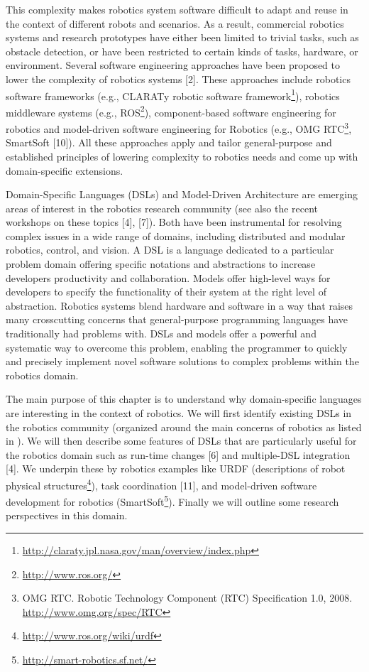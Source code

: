 \documentclass[doc]{apa}
\begin{document}
This complexity makes robotics system software difficult to adapt and reuse in the context of different robots and scenarios. As a result, commercial robotics systems and research prototypes have either been limited to trivial tasks, such as obstacle detection, or have been restricted to certain kinds of tasks, hardware, or environment. Several software engineering approaches have been proposed to lower the complexity of robotics systems [2]. These approaches include robotics software frameworks (e.g., CLARATy robotic software framework\footnote{\url{http://claraty.jpl.nasa.gov/man/overview/index.php}}), robotics middleware systems (e.g., ROS\footnote{\url{http://www.ros.org/}}), component-based software engineering for robotics\cite{Brugali:2007oq} and model-driven software engineering for Robotics (e.g., OMG RTC\footnote{OMG RTC. Robotic Technology Component (RTC) Specification 1.0, 2008. \url{http://www.omg.org/spec/RTC}}, SmartSoft [10]). All these approaches apply and tailor general-purpose and established principles of lowering complexity to robotics needs and come up with domain-specific extensions.

Domain-Specific Languages (DSLs)\cite{Deursen:2000uq} and Model-Driven Architecture are emerging areas of interest in the robotics research community (see also the recent workshops on these topics [4], [7]). Both have been instrumental for resolving complex issues in a wide range of domains, including distributed and modular robotics, control, and vision. A DSL is a language dedicated to a particular problem domain offering specific notations and abstractions to increase developers productivity and collaboration. Models offer high-level ways for developers to specify the functionality of their system at the right level of abstraction. Robotics systems blend hardware and software in a way that raises many crosscutting concerns that general-purpose programming languages have traditionally had problems with. DSLs and models offer a powerful and systematic way to overcome this problem, enabling the programmer to quickly and precisely implement novel software solutions to complex problems within the robotics domain.

The main purpose of this chapter is to understand why domain-specific languages are interesting in the context of robotics. We will first identify existing DSLs in the robotics community (organized around the main concerns of robotics as listed in \cite{SpringerHandbook:2008fk}). We will then describe some features of DSLs that are particularly useful for the robotics domain such as run-time changes [6] and multiple-DSL integration [4]. We underpin these by robotics examples like URDF (descriptions of robot physical structures\footnote{\url{http://www.ros.org/wiki/urdf}}), task coordination [11], and model-driven software development for robotics (SmartSoft\footnote{\url{http://smart-robotics.sf.net/}}). Finally we will outline some research perspectives in this domain.
\end{document}
